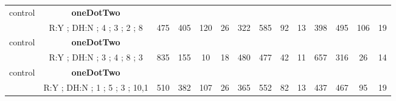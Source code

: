 \begin{table}[]
{\begin{tabular}{|c|c|c|c|c|c|c|c|c|c|c|c|c|c|}
control & \cellcolor{blue!15}\textbf{oneDotTwo}& {\color[HTML]{00009B} } & {\color[HTML]{9A0000} } & {\color[HTML]{009901} } &  & {\color[HTML]{00009B} } & {\color[HTML]{9A0000} } & {\color[HTML]{009901} } &  & {\color[HTML]{00009B} } & {\color[HTML]{9A0000} } & {\color[HTML]{009901} } &  \\ 
 & \cellcolor{ blue!15}R:Y ; DH:N ; 4 ; 3 ; 2 ; 8 & \multirow{-2}{*}{{\color[HTML]{00009B} 475}} & \multirow{-2}{*}{{\color[HTML]{9A0000} 405}} & \multirow{-2}{*}{{\color[HTML]{009901} 120}} & \multirow{-2}{*}{26} & \multirow{-2}{*}{{\color[HTML]{00009B} 322}} & \multirow{-2}{*}{{\color[HTML]{9A0000} 585}} & \multirow{-2}{*}{{\color[HTML]{009901} 92}} & \multirow{-2}{*}{13} & \multirow{-2}{*}{{\color[HTML]{00009B} 398}} & \multirow{-2}{*}{{\color[HTML]{9A0000} 495}} & \multirow{-2}{*}{{\color[HTML]{009901} 106}} & \multirow{-2}{*}{19} \\ \hline

control & \cellcolor{blue!15}\textbf{oneDotTwo}& {\color[HTML]{00009B} } & {\color[HTML]{9A0000} } & {\color[HTML]{009901} } &  & {\color[HTML]{00009B} } & {\color[HTML]{9A0000} } & {\color[HTML]{009901} } &  & {\color[HTML]{00009B} } & {\color[HTML]{9A0000} } & {\color[HTML]{009901} } &  \\ 
 & \cellcolor{ blue!15}R:Y ; DH:N ; 3 ; 4 ; 8 ; 3 & \multirow{-2}{*}{{\color[HTML]{00009B} 835}} & \multirow{-2}{*}{{\color[HTML]{9A0000} 155}} & \multirow{-2}{*}{{\color[HTML]{009901} 10}} & \multirow{-2}{*}{18} & \multirow{-2}{*}{{\color[HTML]{00009B} 480}} & \multirow{-2}{*}{{\color[HTML]{9A0000} 477}} & \multirow{-2}{*}{{\color[HTML]{009901} 42}} & \multirow{-2}{*}{11} & \multirow{-2}{*}{{\color[HTML]{00009B} 657}} & \multirow{-2}{*}{{\color[HTML]{9A0000} 316}} & \multirow{-2}{*}{{\color[HTML]{009901} 26}} & \multirow{-2}{*}{14} \\ \hline

control & \cellcolor{blue!15}\textbf{oneDotTwo}& {\color[HTML]{00009B} } & {\color[HTML]{9A0000} } & {\color[HTML]{009901} } &  & {\color[HTML]{00009B} } & {\color[HTML]{9A0000} } & {\color[HTML]{009901} } &  & {\color[HTML]{00009B} } & {\color[HTML]{9A0000} } & {\color[HTML]{009901} } &  \\ 
 & \cellcolor{ blue!15}R:Y ; DH:N ; 1 ; 5 ; 3 ; 10,1 & \multirow{-2}{*}{{\color[HTML]{00009B} 510}} & \multirow{-2}{*}{{\color[HTML]{9A0000} 382}} & \multirow{-2}{*}{{\color[HTML]{009901} 107}} & \multirow{-2}{*}{26} & \multirow{-2}{*}{{\color[HTML]{00009B} 365}} & \multirow{-2}{*}{{\color[HTML]{9A0000} 552}} & \multirow{-2}{*}{{\color[HTML]{009901} 82}} & \multirow{-2}{*}{13} & \multirow{-2}{*}{{\color[HTML]{00009B} 437}} & \multirow{-2}{*}{{\color[HTML]{9A0000} 467}} & \multirow{-2}{*}{{\color[HTML]{009901} 95}} & \multirow{-2}{*}{19} \\ \hline


\end{tabular}}
\end{table}
